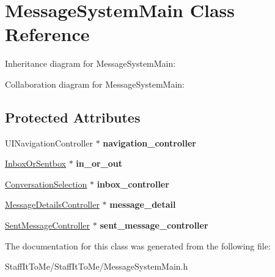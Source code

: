 \hypertarget{interface_message_system_main}{
\section{\-Message\-System\-Main \-Class \-Reference}
\label{interface_message_system_main}
}


\-Inheritance diagram for \-Message\-System\-Main\-:


\-Collaboration diagram for \-Message\-System\-Main\-:
\subsection*{\-Protected \-Attributes}
\begin{DoxyCompactItemize}
\item 
\hypertarget{interface_message_system_main_ad6a24f18c7685eb5b2e91204b02a6f82}{
\-U\-I\-Navigation\-Controller $\ast$ {\bfseries navigation\-\_\-controller}}
\label{interface_message_system_main_ad6a24f18c7685eb5b2e91204b02a6f82}

\item 
\hypertarget{interface_message_system_main_a9785e36bc4967e3a9ea1f9d931d81ebc}{
\hyperlink{interface_inbox_or_sentbox}{\-Inbox\-Or\-Sentbox} $\ast$ {\bfseries in\-\_\-or\-\_\-out}}
\label{interface_message_system_main_a9785e36bc4967e3a9ea1f9d931d81ebc}

\item 
\hypertarget{interface_message_system_main_aad3517eb8dca0ee91d7c78529b6dbab3}{
\hyperlink{interface_conversation_selection}{\-Conversation\-Selection} $\ast$ {\bfseries inbox\-\_\-controller}}
\label{interface_message_system_main_aad3517eb8dca0ee91d7c78529b6dbab3}

\item 
\hypertarget{interface_message_system_main_ab4d7f206c0cc743d8b9c54720184a717}{
\hyperlink{interface_message_details_controller}{\-Message\-Details\-Controller} $\ast$ {\bfseries message\-\_\-detail}}
\label{interface_message_system_main_ab4d7f206c0cc743d8b9c54720184a717}

\item 
\hypertarget{interface_message_system_main_ab6a71a3ffcebfef8805fa644f4d1d00b}{
\hyperlink{interface_sent_message_controller}{\-Sent\-Message\-Controller} $\ast$ {\bfseries sent\-\_\-message\-\_\-controller}}
\label{interface_message_system_main_ab6a71a3ffcebfef8805fa644f4d1d00b}

\end{DoxyCompactItemize}


\-The documentation for this class was generated from the following file\-:\begin{DoxyCompactItemize}
\item 
\-Staff\-It\-To\-Me/\-Staff\-It\-To\-Me/\-Message\-System\-Main.\-h\end{DoxyCompactItemize}
